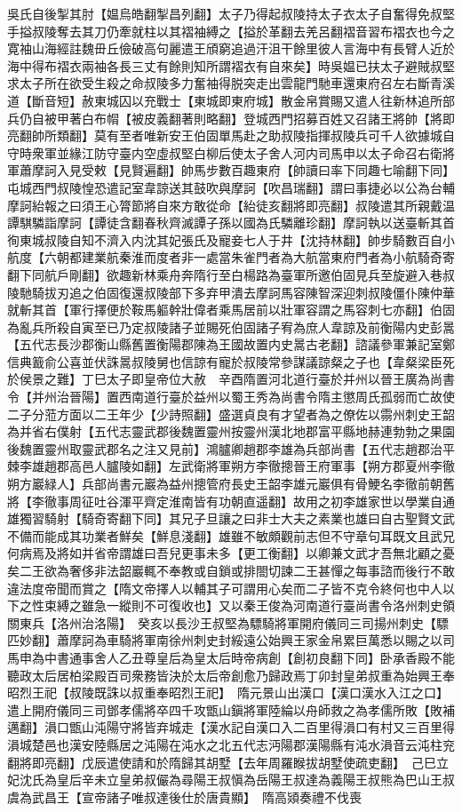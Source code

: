 吳氏自後掣其肘【媪烏皓翻掣昌列翻】太子乃得起叔陵持太子衣太子自奮得免叔堅手搤叔陵奪去其刀仍牽就柱以其褶袖縛之【搤於革翻去羌呂翻褶音習布褶衣也今之寛袖山海經註魏毌丘儉破高句麗遣王頎窮追過汗沮干餘里彼人言海中有長臂人近於海中得布褶衣兩袖各長三丈有餘則知所謂褶衣有自來矣】時吳媪已扶太子避賊叔堅求太子所在欲受生殺之命叔陵多力奮袖得脱突走出雲龍門馳車還東府召左右斷青溪道【斷音短】赦東城囚以充戰士【東城即東府城】散金帛賞賜又遣人往新林追所部兵仍自被甲著白布㡌【被皮義翻著則略翻】登城西門招募百姓又召諸王將帥【將即亮翻帥所類翻】莫有至者唯新安王伯固單馬赴之助叔陵指揮叔陵兵可千人欲據城自守時衆軍並緣江防守臺内空虛叔堅白柳后使太子舍人河内司馬申以太子命召右衛將軍蕭摩訶入見受敕【見賢遍翻】帥馬步數百趣東府【帥讀曰率下同趣七喻翻下同】屯城西門叔陵惶恐遣記室韋諒送其鼓吹與摩訶【吹昌瑞翻】謂曰事捷必以公為台輔摩訶紿報之曰須王心膂節將自來方敢從命【紿徒亥翻將即亮翻】叔陵遣其所親戴温譚騏驎詣摩訶【譚徒含翻春秋齊滅譚子孫以國為氏驎離珍翻】摩訶執以送臺斬其首徇東城叔陵自知不濟入内沈其妃張氏及寵妾七人于井【沈持林翻】帥步騎數百自小航度【六朝都建業航秦淮而度者非一處當朱雀門者為大航當東府門者為小航騎奇寄翻下同航戶剛翻】欲趣新林乘舟奔隋行至白楊路為臺軍所邀伯固見兵至旋避入巷叔陵馳騎拔刃追之伯固復還叔陵部下多弃甲潰去摩訶馬容陳智深迎刺叔陵僵仆陳仲華就斬其首【軍行擇便於鞍馬軀幹壯偉者乘馬居前以壯軍容謂之馬容刺七亦翻】伯固為亂兵所殺自寅至已乃定叔陵諸子並賜死伯固諸子宥為庶人韋諒及前衡陽内史彭暠【五代志長沙郡衡山縣舊置衡陽郡陳為王國故置内史暠古老翻】諮議參軍兼記室鄭信典籖俞公喜並伏誅暠叔陵舅也信諒有寵於叔陵常參謀議諒粲之子也【韋粲梁臣死於侯景之難】丁巳太子即皇帝位大赦　辛酉隋置河北道行臺於并州以晉王廣為尚書令【并州治晉陽】置西南道行臺於益州以蜀王秀為尚書令隋主懲周氏孤弱而亡故使二子分蒞方面以二王年少【少詩照翻】盛選貞良有才望者為之僚佐以霛州刺史王韶為并省右僕射【五代志靈武郡後魏置靈州按靈州漢北地郡富平縣地赫連勃勃之果園後魏置靈州取靈武郡名之注又見前】鴻臚卿趙郡李雄為兵部尚書【五代志趙郡治平棘李雄趙郡高邑人臚陵如翻】左武衛將軍朔方李徹摠晉王府軍事【朔方郡夏州李徹朔方巖緑人】兵部尚書元巖為益州摠管府長史王韶李雄元巖俱有骨鯁名李徹前朝舊將【李徹事周征吐谷渾平齊定淮南皆有功朝直遥翻】故用之初李雄家世以學業自通雄獨習騎射【騎奇寄翻下同】其兄子旦讓之曰非士大夫之素業也雄曰自古聖賢文武不備而能成其功業者鮮矣【鮮息淺翻】雄雖不敏頗觀前志但不守章句耳既文且武兄何病焉及將如并省帝謂雄曰吾兒更事未多【更工衡翻】以卿兼文武才吾無北顧之憂矣二王欲為奢侈非法韶巖輒不奉教或自鎖或排閤切諫二王甚憚之每事諮而後行不敢違法度帝聞而賞之【隋文帝擇人以輔其子可謂用心矣而二子皆不克令終何也中人以下之性束縛之雖急一縱則不可復收也】又以秦王俊為河南道行臺尚書令洛州刺史領關東兵【洛州治洛陽】　癸亥以長沙王叔堅為驃騎將軍開府儀同三司揚州刺史【驃匹妙翻】蕭摩訶為車騎將軍南徐州刺史封綏遠公始興王家金帛累巨萬悉以賜之以司馬申為中書通事舍人乙丑尊皇后為皇太后時帝病創【創初良翻下同】卧承香殿不能聽政太后居柏梁殿百司衆務皆決於太后帝創愈乃歸政焉丁卯封皇弟叔重為始興王奉昭烈王祀【叔陵既誅以叔重奉昭烈王祀】　隋元景山出漢口【漢口漢水入江之口】遣上開府儀同三司鄧孝儒將卒四千攻甑山鎭將軍陸綸以舟師救之為孝儒所敗【敗補邁翻】溳口甑山沌陽守將皆弃城走【漢水記自漢口入二百里得溳口有村又三百里得溳城楚邑也漢安陸縣居之沌陽在沌水之北五代志沔陽郡漢陽縣有沌水溳音云沌柱兖翻將即亮翻】戊辰遣使請和於隋歸其胡墅【去年周羅睺拔胡墅使疏吏翻】　己巳立妃沈氏為皇后辛未立皇弟叔儼為尋陽王叔愼為岳陽王叔達為義陽王叔熊為巴山王叔虞為武昌王【宣帝諸子唯叔達後仕於唐貴顯】　隋高熲奏禮不伐喪